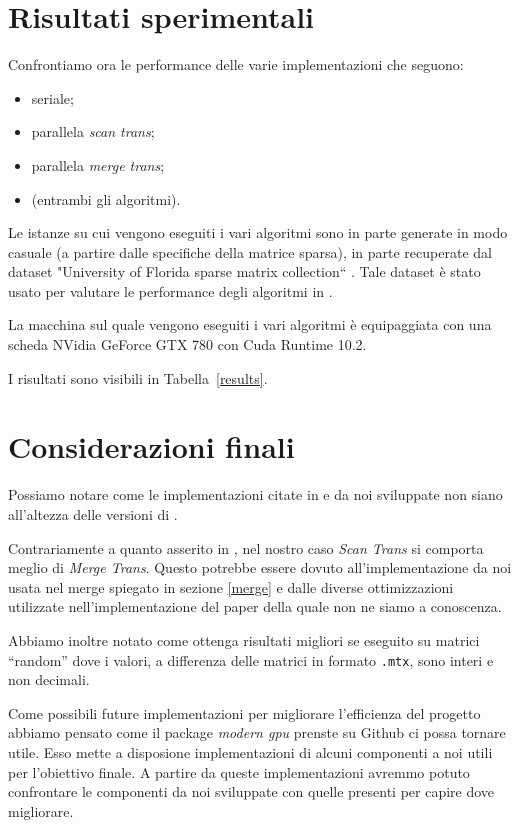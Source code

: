 

\section{Risultati sperimentali}

Confrontiamo ora le performance delle varie implementazioni che seguono:
\begin{itemize}
    \item seriale;
    \item parallela \emph{scan trans};
    \item parallela \emph{merge trans};
    \item \cuSPARSE (entrambi gli algoritmi).
\end{itemize}

Le istanze su cui vengono eseguiti i vari algoritmi sono in parte generate in modo casuale (a partire dalle specifiche della matrice sparsa), in parte recuperate dal dataset "University  of Florida sparse  matrix collection`` \cite{dataset}. Tale dataset è stato usato per valutare le performance degli algoritmi in \cite{parallelTrans}.

La macchina sul quale vengono eseguiti i vari algoritmi è equipaggiata con una scheda NVidia GeForce GTX 780 con Cuda Runtime 10.2.

I risultati sono visibili in Tabella~\ref{results}. 

\section{Considerazioni finali}\label{conclusioni}
Possiamo notare come le implementazioni citate in \cite{parallelTrans} e da noi sviluppate non siano all'altezza delle versioni di \cuSPARSE.

Contrariamente a quanto asserito in \cite{parallelTrans}, nel nostro caso \textit{Scan Trans} si comporta meglio di \textit{Merge Trans}. Questo potrebbe essere dovuto all'implementazione da noi usata nel merge spiegato in sezione \ref{merge} e dalle diverse ottimizzazioni utilizzate nell'implementazione del paper della quale non ne siamo a conoscenza.

Abbiamo inoltre notato come \ScanTrans ottenga risultati migliori se eseguito su matrici ``random'' dove i valori, a differenza delle matrici in formato \texttt{.mtx}, sono interi e non decimali.

Come possibili future implementazioni per migliorare l'efficienza del progetto abbiamo pensato come il package \textit{modern gpu} prenste su Github ci possa tornare utile. Esso mette a disposione implementazioni di alcuni componenti a noi utili per l'obiettivo finale. A partire da queste implementazioni avremmo potuto confrontare le componenti da noi sviluppate con quelle presenti per capire dove migliorare. 



